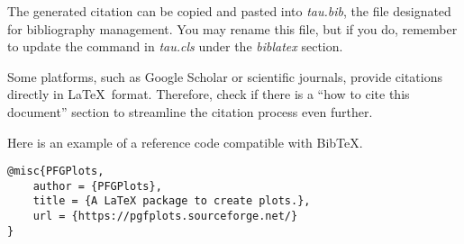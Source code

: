 \documentclass[9pt,a4paper,twocolumn,twoside]{lab-class/lab}
\begin{document}
        The generated citation can be copied and pasted into \textit{tau.bib}, the file designated for bibliography management. You may rename this file, but if you do, remember to update the \verb|| command in \textit{tau.cls} under the \textit{biblatex} section.
    
        \begin{note}
            Some platforms, such as Google Scholar or scientific journals, provide citations directly in \LaTeX\ format. Therefore, check if there is a ``how to cite this document'' section to streamline the citation process even further.
        \end{note}
    
        Here is an example of a reference code compatible with Bib\TeX.

\begin{verbatim}
@misc{PFGPlots,
    author = {PFGPlots},
    title = {A LaTeX package to create plots.},
    url = {https://pgfplots.sourceforge.net/}
}
\end{verbatim}


    

\end{document}
